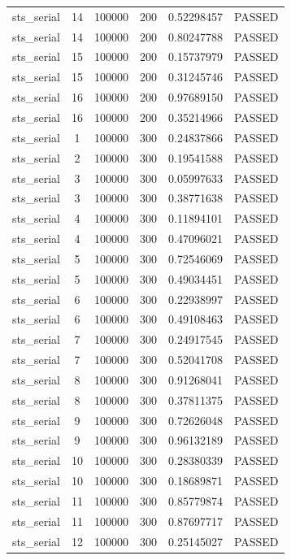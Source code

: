 \begin{longtable}{cccccc}
sts\_serial & 14 & 100000 & 200 & 0.52298457 & PASSED \\
sts\_serial & 14 & 100000 & 200 & 0.80247788 & PASSED \\
sts\_serial & 15 & 100000 & 200 & 0.15737979 & PASSED \\
sts\_serial & 15 & 100000 & 200 & 0.31245746 & PASSED \\
sts\_serial & 16 & 100000 & 200 & 0.97689150 & PASSED \\
sts\_serial & 16 & 100000 & 200 & 0.35214966 & PASSED \\
sts\_serial & 1 & 100000 & 300 & 0.24837866 & PASSED \\
sts\_serial & 2 & 100000 & 300 & 0.19541588 & PASSED \\
sts\_serial & 3 & 100000 & 300 & 0.05997633 & PASSED \\
sts\_serial & 3 & 100000 & 300 & 0.38771638 & PASSED \\
sts\_serial & 4 & 100000 & 300 & 0.11894101 & PASSED \\
sts\_serial & 4 & 100000 & 300 & 0.47096021 & PASSED \\
sts\_serial & 5 & 100000 & 300 & 0.72546069 & PASSED \\
sts\_serial & 5 & 100000 & 300 & 0.49034451 & PASSED \\
sts\_serial & 6 & 100000 & 300 & 0.22938997 & PASSED \\
sts\_serial & 6 & 100000 & 300 & 0.49108463 & PASSED \\
sts\_serial & 7 & 100000 & 300 & 0.24917545 & PASSED \\
sts\_serial & 7 & 100000 & 300 & 0.52041708 & PASSED \\
sts\_serial & 8 & 100000 & 300 & 0.91268041 & PASSED \\
sts\_serial & 8 & 100000 & 300 & 0.37811375 & PASSED \\
sts\_serial & 9 & 100000 & 300 & 0.72626048 & PASSED \\
sts\_serial & 9 & 100000 & 300 & 0.96132189 & PASSED \\
sts\_serial & 10 & 100000 & 300 & 0.28380339 & PASSED \\
sts\_serial & 10 & 100000 & 300 & 0.18689871 & PASSED \\
sts\_serial & 11 & 100000 & 300 & 0.85779874 & PASSED \\
sts\_serial & 11 & 100000 & 300 & 0.87697717 & PASSED \\
sts\_serial & 12 & 100000 & 300 & 0.25145027 & PASSED \\

\end{longtable}
